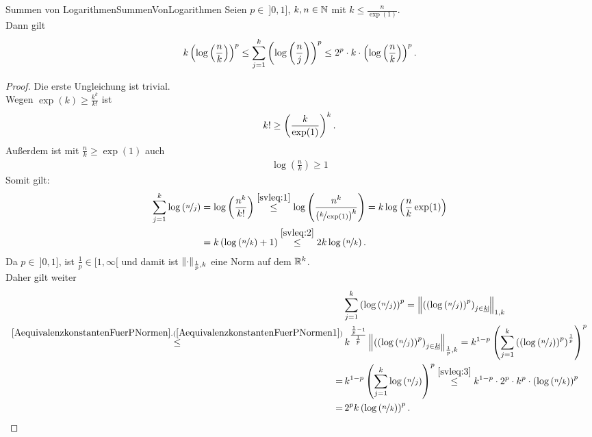 \begin{lemma}{Summen von Logarithmen}{SummenVonLogarithmen}
Seien $p \in \!\ ]0,1]$, $k, n \in \mathbb{N}$ mit $k \le \frac n {\exp(1)}$.\\
Dann gilt
\[k\left(\log\left(\frac n k \right) \right)^p
\le \sum_{j=1}^k \left(\log\left(\frac n j \right) \right)^p
\le 2^p \cdot k \cdot \left(\log\left(\frac n k \right) \right)^p\text.\]
\end{lemma}
\begin{proof}
Die erste Ungleichung ist trivial.\\
Wegen $\exp(k)\ge\frac{k^k}{k!}$ ist
\begin{align}
k!\ge\left(\frac k{\exp(1)}\right)^k\text.\label{svleq:1}
\end{align}
Außerdem ist mit $\frac n k \ge \exp(1)$ auch
\begin{align}
\log\left(\frac n k \right) \ge 1\label{svleq:2}
\end{align}
Somit gilt:
\begin{align}
\sum_{j=1}^k \log\left(\nicefrac n j \right) &=
\log\left(\frac{n^k}{k!} \right) \overset{\eqref{svleq:1}}\le
\log\left(\frac{n^k}{\left(\nicefrac{k}{\exp(1)} \right)^k} \right)
= k \log\left(\frac n k \exp(1) \right)\notag\\
&= k\left(\log\left(\nicefrac n k\right) + 1 \right)
\overset{\eqref{svleq:2}}\le 2k\log\left(\nicefrac n k \right)\text.
\label{svleq:3}
\end{align}
Da $p \in \!\ ]0, 1]$, ist $\frac 1 p \in [1, \infty[$ und damit ist
$\lVert\cdot\rVert_{\frac 1 p, k}$ eine Norm auf dem $\mathbb{R}^k$.\\
Daher gilt weiter
\begin{align*}
&\sum_{j=1}^k \left(\log\left(\nicefrac n j \right) \right)^p
=\norma{\left(\left(\log\left(\nicefrac nj\right)\right)^p\right)_
{j\in \haken k}}_{1,k}\\
\overset{\refclaim{AequivalenzkonstantenFuerPNormen}
{AequivalenzkonstantenFuerPNormen1}}\le &\,
k^{\frac{\frac 1 p -1}{\frac 1 p}}
\norma{\left(\left(\log\left(\nicefrac nj\right)\right)^p\right)
_{j\in\haken k}}_{\frac 1p,k}
= k^{1-p}\left(\sum_{j=1}^k \left( \left(
\log\left(\nicefrac nj\right)\right)^p\right)^{\frac 1 p} \right)^p\\
=&\, k^{1-p}\left(\sum_{j=1}^k \log\left(\nicefrac n j \right) \right)^p
\overset{\eqref{svleq:3}}\le
k^{1-p}\cdot 2^p \cdot k^p \cdot 
\left(\log\left(\nicefrac nk \right) \right)^p\\
=&\, 2^p k \left(\log\left(\nicefrac n k \right) \right)^p\text.
\end{align*}
\end{proof}